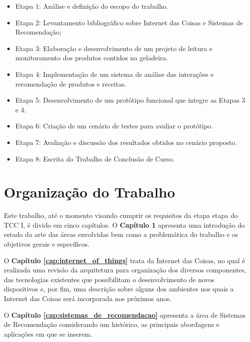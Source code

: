 \begin{itemize}\parskip -1pt
    \item Etapa 1: Análise e definição do escopo do trabalho.
	\item Etapa 2: Levantamento bibliográfico sobre Internet das Coisas e Sistemas de Recomendação;
	\item Etapa 3: Elaboração e desenvolvimento de um projeto de leitura e monitoramento dos produtos contidos na geladeira.
	\item Etapa 4: Implementação de um sistema de análise das interações e recomendação de produtos e receitas.
	\item Etapa 5: Desenvolvimento de um protótipo funcional que integre as Etapas 3 e 4.
	\item Etapa 6: Criação de um cenário de testes para avaliar o protótipo.
	\item Etapa 7: Avaliação e discussão dos resultados obtidos no cenário proposto.
	\item Etapa 8: Escrita do Trabalho de Conclusão de Curso.
\end{itemize}




\section{Organização do Trabalho} %

Este trabalho, até o momento visando cumprir os requisitos da etapa etapa do TCC I, é divido em cinco capítulos. O \textbf{Capítulo 1} apresenta uma introdução do estado da arte das áreas envolvidas bem como a problemática do trabalho e os objetivos gerais e específicos.

O \textbf{Capítulo \ref{cap:internet_of_things}} trata da Internet das Coisas, no qual é realizada uma revisão da arquitetura para organização dos diversos componentes, das tecnologias existentes que possibilitam o desenvolvimento de novos dispositivos e, por fim, uma descrição sobre alguns dos ambientes nos quais a Internet das Coisas será incorporada nos próximos anos.

O \textbf{Capítulo \ref{cap:sistemas_de_recomendacao}} apresenta a área de Sistemas de Recomendação considerando um histórico, as principais abordagens e aplicações em que se inserem.  

